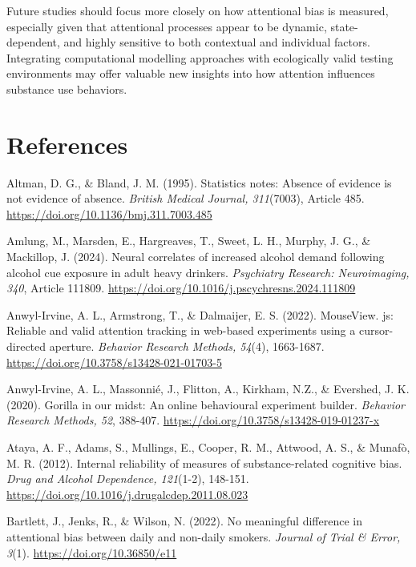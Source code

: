 \documentclass[authordate, reflection, issue]{jote-new-article}
\begin{document}
	Future studies should focus more closely on how attentional bias is measured, especially given that attentional processes appear to be dynamic, state-dependent, and highly sensitive to both contextual and individual factors. Integrating computational modelling approaches with ecologically valid testing environments may offer valuable new insights into how attention influences substance use behaviors.



	\section{References}



	Altman, D. G., \& Bland, J. M. (1995). Statistics notes: Absence of evidence is not evidence of absence. \emph{British Medical Journal, 311}(7003), Article 485. \url{https://doi.org/10.1136/bmj.311.7003.485}



	Amlung, M., Marsden, E., Hargreaves, T., Sweet, L. H., Murphy, J. G., \& Mackillop, J. (2024). Neural correlates of increased alcohol demand following alcohol cue exposure in adult heavy drinkers. \emph{Psychiatry Research: Neuroimaging, 340}, Article 111809. \url{https://doi.org/10.1016/j.pscychresns.2024.111809}



	Anwyl-Irvine, A. L., Armstrong, T., \& Dalmaijer, E. S. (2022). MouseView. js: Reliable and valid attention tracking in web-based experiments using a cursor-directed aperture. \emph{Behavior Research Methods, 54}(4), 1663-1687. \url{https://doi.org/10.3758/s13428-021-01703-5}



	Anwyl-Irvine, A. L., Massonnié, J., Flitton, A., Kirkham, N.Z., \& Evershed, J. K. (2020). Gorilla in our midst: An online behavioural experiment builder. \emph{Behavior Research Methods, 52}, 388-407. \url{https://doi.org/10.3758/s13428-019-01237-x}



	Ataya, A. F., Adams, S., Mullings, E., Cooper, R. M., Attwood, A. S., \& Munafò, M. R. (2012). Internal reliability of measures of substance-related cognitive bias. \emph{Drug and Alcohol Dependence, 121}(1-2), 148-151. \url{https://doi.org/10.1016/j.drugalcdep.2011.08.023}



	Bartlett, J., Jenks, R., \& Wilson, N. (2022). No meaningful difference in attentional bias between daily and non-daily smokers. \emph{Journal of Trial \& Error, 3}(1). \url{https://doi.org/10.36850/e11}
\end{document}
